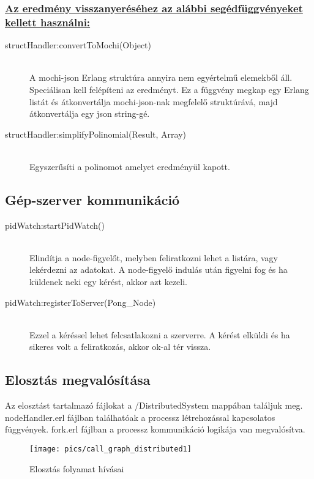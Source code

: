 	\subsubsection{\underline{Az eredmény visszanyeréséhez az alábbi segédfüggvényeket kellett használni:}}
	\begin{description}
	
		\item[structHandler:convertToMochi(Object)] \hfill \\ 
		A mochi-json Erlang struktúra annyira nem egyértelmű elemekből áll. Speciálisan kell felépíteni az eredményt. Ez a függvény megkap egy Erlang listát és átkonvertálja mochi-json-nak megfelelő struktúrává, majd átkonvertálja egy json string-gé.

		\item[structHandler:simplifyPolinomial(Result, Array) ] \hfill \\ 
		Egyszerűsíti a polinomot amelyet eredményül kapott.
	
	\end{description}
\subsection{Gép-szerver kommunikáció}
	\begin{description}
	\item[pidWatch:startPidWatch()]
	\hfill \\ Elindítja a node-figyelőt, melyben feliratkozni lehet a listára, vagy lekérdezni az adatokat. A node-figyelő indulás után figyelni fog és ha küldenek neki egy kérést, akkor azt kezeli. 
	\item[pidWatch:registerToServer(Pong\_Node)]
	\hfill \\ Ezzel a kéréssel lehet felcsatlakozni a szerverre. A kérést elküldi és ha sikeres volt a feliratkozás, akkor ok-al tér vissza.
	\end{description}
\subsection{Elosztás megvalósítása}
	Az elosztást tartalmazó fájlokat a /DistributedSystem mappában találjuk meg. nodeHandler.erl fájlban találhatóak a processz létrehozással kapcsolatos függvények. fork.erl fájlban a processz kommunikáció logikája van megvalósítva.

	\begin{figure}[h]
		\texttt{[image: pics/call\_graph\_distributed1]}
		\centering
		\caption{Elosztás folyamat hívásai\label{fig:call_graph_distributed1}}
	\end{figure}

